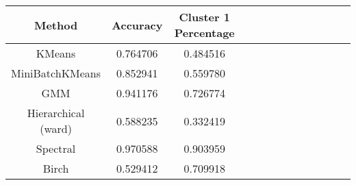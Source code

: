 \begin{tabular}{ccccccccccccc}
\toprule
             Method &  Accuracy &  Cluster 1 Percentage \\
\midrule
             KMeans &  0.764706 &              0.484516 \\
    MiniBatchKMeans &  0.852941 &              0.559780 \\
                GMM &  0.941176 &              0.726774 \\
Hierarchical (ward) &  0.588235 &              0.332419 \\
           Spectral &  0.970588 &              0.903959 \\
              Birch &  0.529412 &              0.709918 \\
\bottomrule
\end{tabular}
